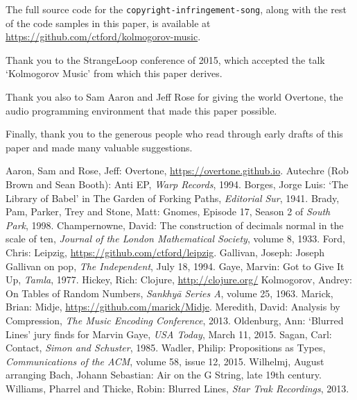 \documentclass[numbers]{sigplanconf}
\begin{document}
The full source code for the \verb|copyright-infringement-song|, along with the rest of the code samples in this paper, is
available at \url{https://github.com/ctford/kolmogorov-music}.

\acks

Thank you to the StrangeLoop conference of 2015, which accepted the talk `Kolmogorov Music' from which this paper derives.

Thank you also to Sam Aaron and Jeff Rose for giving the world Overtone\cite{Overtone}, the audio programming environment
that made this paper possible.

Finally, thank you to the generous people who read through early drafts of this paper and made many valuable suggestions.




\begin{thebibliography}{}
\softraggedright

 Aaron, Sam and Rose, Jeff: Overtone, \url{https://overtone.github.io}.
 Autechre (Rob Brown and Sean Booth): Anti EP, \textit{Warp Records}, 1994.
 Borges, Jorge Luis: `The Library of Babel' in The Garden of Forking Paths, \textit{Editorial Sur}, 1941.
 Brady, Pam, Parker, Trey and Stone, Matt: Gnomes, Episode 17, Season 2 of \textit{South Park}, 1998.
 Champernowne, David: The construction of decimals normal in the scale of ten, \textit{Journal of the London Mathematical Society}, volume 8, 1933.
 Ford, Chris: Leipzig, \url{https://github.com/ctford/leipzig}.
 Gallivan, Joseph: Joseph Gallivan on pop, \textit{The Independent}, July 18, 1994.
 Gaye, Marvin: Got to Give It Up, \textit{Tamla}, 1977.
 Hickey, Rich: Clojure, \url{http://clojure.org/}
  Kolmogorov, Andrey: On Tables of Random Numbers, \textit{Sankhyā Series A}, volume 25, 1963.
 Marick, Brian: Midje, \url{https://github.com/marick/Midje}.
 Meredith, David: Analysis by Compression, \textit{The Music Encoding Conference}, 2013.
 Oldenburg, Ann: `Blurred Lines' jury finds for Marvin Gaye, \textit{USA Today}, March 11, 2015.
 Sagan, Carl: Contact, \textit{Simon and Schuster}, 1985.
 Wadler, Philip: Propositions as Types, \textit{Communications of the ACM}, volume 58, issue 12, 2015.
 Wilhelmj, August arranging Bach, Johann Sebastian: Air on the G String, late 19th century.
 Williams, Pharrel and Thicke, Robin: Blurred Lines, \textit{Star Trak Recordings}, 2013.

\end{thebibliography}
\end{document}
